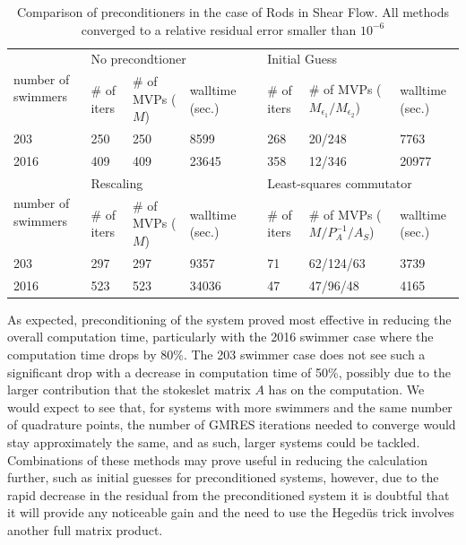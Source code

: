 \begin{table}
\begin{singlespace}
\centering
\setlength{\tabcolsep}{6pt}
\renewcommand{\arraystretch}{1.4}
\caption{Comparison of preconditioners in the case of Rods in Shear Flow. All methods converged to a relative residual error smaller than $10^{-6}$}
\small
\begin{tabular}{p{2cm} p{1cm} p{2cm} p{1.5cm} p{0.1cm} p{1cm} p{2cm} p{1.5cm}}
\multirow{2}{*}{\parbox{1.8cm}{number of swimmers}} & \multicolumn{3}{l}{No precondtioner} & & \multicolumn{3}{l}{Initial Guess} \\ \cline{2-4} \cline{6-8}
  & \# of iters & \# of MVPs ($M$) & walltime (sec.) & & \# of iters & \# of MVPs ($M_{\epsilon_1}/M_{\epsilon_2}$) & walltime (sec.) \\ \hline
  203 & 250 & 250 & 8599 & &  268 & 20/248 & 7763\\
  2016 & 409 & 409 & 23645 & & 358 & 12/346 & 20977\\ \hline
  \multirow{2}{*}{\parbox{1.8cm}{number of swimmers}} & \multicolumn{3}{l}{Rescaling} & &\multicolumn{3}{l}{Least-squares commutator} \\ \cline{2-4} \cline{6-8}
  & \# of iters & \# of MVPs ($M$) & walltime (sec.) & & \# of iters & \# of MVPs ($M/P_A^{-1}/A_S$) & walltime (sec.) \\ \hline
  203 & 297 & 297 & 9357 & & 71 & 62/124/63 & 3739 \\
  2016 & 523 & 523 & 34036 & & 47 & 47/96/48 & 4165 
\end{tabular}
\label{tab:Preconditioning}
\end{singlespace}
\end{table}

As expected, preconditioning of the system proved most effective in reducing the overall computation time, particularly with the 2016 swimmer case where the computation time drops by 80\%. The 203 swimmer case does not see such a significant drop with a decrease in computation time of 50\%, possibly due to the larger contribution that the stokeslet matrix $A$ has on the computation. We would expect to see that, for systems with more swimmers and the same number of quadrature points, the number of GMRES iterations needed to converge would stay approximately the same, and as such, larger systems could be tackled. Combinations of these methods may prove useful in reducing the calculation further, such as initial guesses for preconditioned systems, however, due to the rapid decrease in the residual from the preconditioned system it is doubtful that it will provide any noticeable gain and the need to use the Heged{\"u}s trick involves another full matrix product.

